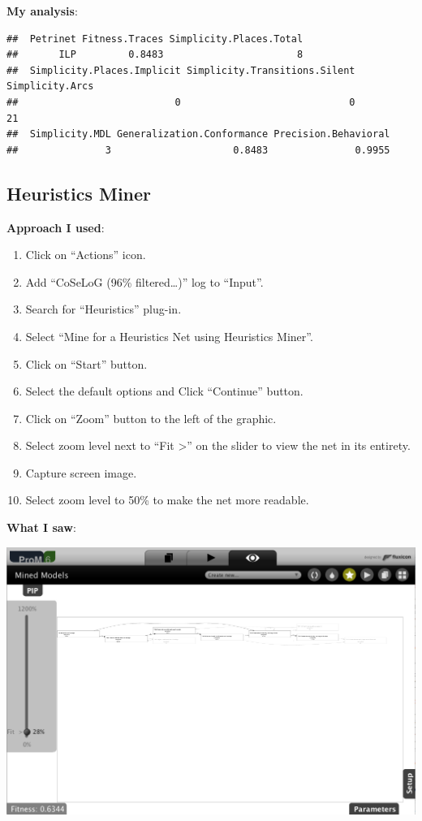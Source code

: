 \documentclass[]{article}
\begin{document}
\textbf{My analysis}:

\begin{verbatim}
##  Petrinet Fitness.Traces Simplicity.Places.Total
##       ILP         0.8483                       8
##  Simplicity.Places.Implicit Simplicity.Transitions.Silent Simplicity.Arcs
##                           0                             0              21
##  Simplicity.MDL Generalization.Conformance Precision.Behavioral
##               3                     0.8483               0.9955
\end{verbatim}

\subsection{Heuristics Miner}\label{heuristics-miner}

\textbf{Approach I used}:

\begin{enumerate}
\def\labelenumi{\arabic{enumi}.}
\itemsep1pt\parskip0pt
\item
  Click on ``Actions'' icon.
\item
  Add ``CoSeLoG (96\% filtered\ldots{})'' log to ``Input''.
\item
  Search for ``Heuristics'' plug-in.
\item
  Select ``Mine for a Heuristics Net using Heuristics Miner''.
\item
  Click on ``Start'' button.
\item
  Select the default options and Click ``Continue'' button.
\item
  Click on ``Zoom'' button to the left of the graphic.
\item
  Select zoom level next to ``Fit \textgreater{}'' on the slider to view
  the net in its entirety.
\item
  Capture screen image.
\item
  Select zoom level to 50\% to make the net more readable.
\end{enumerate}

\textbf{What I saw}:

\includegraphics{CoSeLoG_Step_05_Filter96_Heuristics_Net.png}
\end{document}
